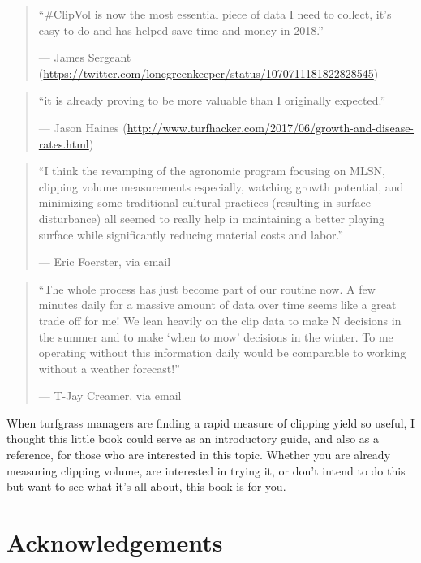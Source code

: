 \documentclass[12pt,b5,]{tufte-book}
\begin{document}
\begin{quote}
``\#ClipVol is now the most essential piece of data I need to collect, it's easy to do and has helped save time and money in 2018.''

--- James Sergeant (\url{https://twitter.com/lonegreenkeeper/status/1070711181822828545})
\end{quote}

\begin{quote}
``it is already proving to be more valuable than I originally expected.''

--- Jason Haines (\url{http://www.turfhacker.com/2017/06/growth-and-disease-rates.html})
\end{quote}

\begin{quote}
``I think the revamping of the agronomic program focusing on MLSN, clipping volume measurements especially, watching growth potential, and minimizing some traditional cultural practices (resulting in surface disturbance) all seemed to really help in maintaining a better playing surface while significantly reducing material costs and labor.''

--- Eric Foerster, via email
\end{quote}

\begin{quote}
``The whole process has just become part of our routine now. A few minutes daily for a massive amount of data over time seems like a great trade off for me! We lean heavily on the clip data to make N decisions in the summer and to make `when to mow' decisions in the winter. To me operating without this information daily would be comparable to working without a weather forecast!''

--- T-Jay Creamer, via email
\end{quote}

When turfgrass managers are finding a rapid measure of clipping yield so useful, I thought this little book could serve as an introductory guide, and also as a reference, for those who are interested in this topic. Whether you are already measuring clipping volume, are interested in trying it, or don't intend to do this but want to see what it's all about, this book is for you.

\hypertarget{acknowledgements}{%
\section*{Acknowledgements}\label{acknowledgements}}
\end{document}
